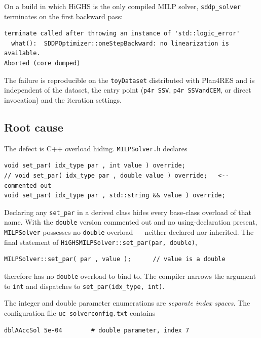 \documentclass[12pt,a4paper]{article}
\begin{document}
On a build in which HiGHS is the only compiled MILP solver, \texttt{sddp\_solver}
terminates on the first backward pass:

\begin{lstlisting}
terminate called after throwing an instance of 'std::logic_error'
  what():  SDDPOptimizer::oneStepBackward: no linearization is available.
Aborted (core dumped)
\end{lstlisting}

The failure is reproducible on the \texttt{toyDataset} distributed with
Plan4RES and is independent of the dataset, the entry point
(\texttt{p4r SSV}, \texttt{p4r SSVandCEM}, or direct invocation) and the
iteration settings.

\subsection{Root cause}

The defect is C++ overload hiding. \texttt{MILPSolver.h} declares

\begin{lstlisting}
void set_par( idx_type par , int value ) override;
// void set_par( idx_type par , double value ) override;   <-- commented out
void set_par( idx_type par , std::string && value ) override;
\end{lstlisting}

Declaring any \texttt{set\_par} in a derived class hides every base-class
overload of that name. With the \texttt{double} version commented out and no
using-declaration present, \texttt{MILPSolver} possesses no \texttt{double}
overload --- neither declared nor inherited. The final statement of
\texttt{HiGHSMILPSolver::set\_par(par, double)},

\begin{lstlisting}
MILPSolver::set_par( par , value );      // value is a double
\end{lstlisting}

therefore has no \texttt{double} overload to bind to. The compiler narrows the
argument to \texttt{int} and dispatches to \texttt{set\_par(idx\_type, int)}.

The integer and double parameter enumerations are \emph{separate index spaces}.
The configuration file \texttt{uc\_solverconfig.txt} contains

\begin{lstlisting}
dblAAccSol 5e-04        # double parameter, index 7
\end{lstlisting}
\end{document}
